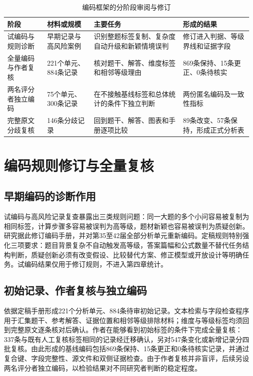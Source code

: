 \documentclass[
  12pt,
  a4paper,twoside,openany]{ctexbook}
\renewcommand{\arraystretch}{1.22}
\begin{document}
\begin{table}[H]
\centering
\caption{编码框架的分阶段审阅与修订}
\label{tab:coding-framework-stages}
\small
\setlength{\tabcolsep}{3.5pt}
\renewcommand{\arraystretch}{1.12}
\begin{tabular}{p{2.15cm}p{2.25cm}p{4.65cm}p{3.45cm}}
\toprule
阶段 & 材料或规模 & 主要任务 & 形成的结果 \\
\midrule
试编码与规则诊断 & 早期记录与高风险案例 & 识别整题标签复制、复杂度自动升级和新颖情境误判 & 修订进入判据、等级界线和证据字段 \\
全量编码与作者复核 & 221个单元、884条记录 & 核对题干、解答、维度标签和相邻等级理由 & 869条保持、15条更正、0条待核实 \\
两名评分者独立编码 & 75个单元、300条记录 & 在不接触基线标签和总体统计的条件下独立判断 & 两份匿名编码及一致性指标 \\
完整原文分歧复核 & 146条分歧记录 & 回到题干、解答、图表和手册逐项比较 & 89条改变、57条保持，形成正式分析表 \\
\bottomrule
\end{tabular}
\end{table}

\section{编码规则修订与全量复核}\label{ux7f16ux7801ux89c4ux5219ux4feeux8ba2ux4e0eux5168ux91cfux590dux6838}

\subsection{早期编码的诊断作用}\label{ux65e9ux671fux7f16ux7801ux7684ux8bcaux65adux4f5cux7528}

试编码与高风险记录复查暴露出三类规则问题：同一大题的多个小问容易被复制为相同标签，计算步骤多容易被误判为高等级，题材新颖也容易被误判为质疑创新。研究据此修订编码手册，并对第35至42届全部分析单元重新编码。定稿规则特别强化三项要求：题目背景复杂不自动触发高等级，答案篇幅和公式数量不替代任务结构判断，质疑创新必须有改变假设、比较替代方案、修正模型或开放设计等明确任务。试编码结果仅用于修订规则，不进入第四章统计。

\subsection{初始记录、作者复核与独立编码}\label{ux521dux59cbux8bb0ux5f55ux4f5cux8005ux590dux6838ux4e0eux72ecux7acbux7f16ux7801}

依据定稿手册形成221个分析单元、884条待审初始记录。文本检索与字段检查程序用于汇集题干、参考解答、证据位置和相邻等级排除材料；维度与等级标签均须回到完整原文逐条核对后确认。作者在能够看到初始标签的条件下完成全量复核：337条与既有人工复核标签相同的记录经迁移确认，另对547条变化或新增记录分四批复核。由此形成的基线编码包括869条保持、15条更正和0条待核实记录，并通过复合键、字段完整性、源文件和双侧证据检查。由于作者复核并非盲评，后续另设两名评分者独立编码，以检验结果对不同研究者判断的稳定程度。
\end{document}
